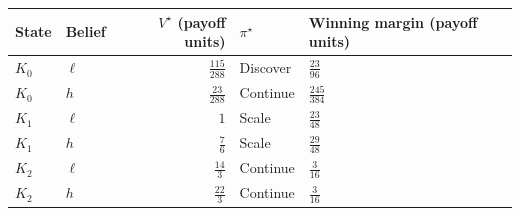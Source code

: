 \begin{tabular}{@{}llrll@{}}
\toprule
State & Belief & \(V^\star\) (payoff units) & \(\pi^\star\) & Winning margin (payoff units) \\
\midrule
\(K_{0}\)&\(\ell\)&\(\frac{115}{288}\)&Discover&\(\frac{23}{96}\)\\
\(K_{0}\)&\(h\)&\(\frac{23}{288}\)&Continue&\(\frac{245}{384}\)\\
\(K_{1}\)&\(\ell\)&\(1\)&Scale&\(\frac{23}{48}\)\\
\(K_{1}\)&\(h\)&\(\frac{7}{6}\)&Scale&\(\frac{29}{48}\)\\
\(K_{2}\)&\(\ell\)&\(\frac{14}{3}\)&Continue&\(\frac{3}{16}\)\\
\(K_{2}\)&\(h\)&\(\frac{22}{3}\)&Continue&\(\frac{3}{16}\)\\
\bottomrule
\end{tabular}
